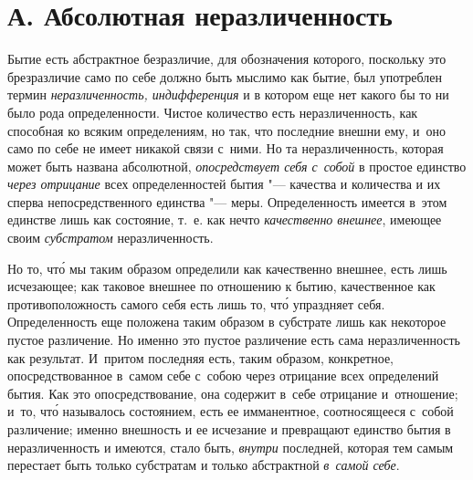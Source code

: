 \section[А. Абсолютная неразличенность]%
{А. Абсолютная неразличенность}

Бытие есть абстрактное безразличие, для обозначения которого, поскольку это
брезразличие само по себе должно быть мыслимо как бытие, был употреблен
термин {\em неразличенность, индифференция}
и в котором еще нет какого бы то ни было рода определенности. Чистое количество
есть неразличенность, как способная ко всяким определениям, но так, что
последние внешни ему, и~оно само по себе не имеет никакой связи с~ними. Но та
неразличенность, которая может быть названа абсолютной, {\em опосредствует себя
с~собой} в простое единство {\em через отрицание} всех определенностей бытия
"--- качества и количества и их сперва непосредственного единства "--- меры.
Определенность имеется в~этом единстве лишь как состояние, т.~е. как нечто
{\em качественно внешнее}, имеющее своим {\em субстратом} неразличенность.

Но то, чт\'{о} мы таким образом определили как качественно внешнее, есть лишь
исчезающее; как таковое внешнее по отношению к бытию, качественное как
противоположность самого себя есть лишь то, чт\'{о} упраздняет себя.
Определенность еще положена таким образом в субстрате лишь как некоторое пустое
различение. Но именно это пустое различение есть сама неразличенность
как результат. И~притом последняя есть, таким образом, конкретное,
опосредствованное в~самом себе с~собою через отрицание всех определений бытия.
Как это опосредствование, она содержит в~себе отрицание и~отношение; и~то,
чт\'{о} называлось состоянием, есть ее имманентное, соотносящееся с~собой
различение; именно внешность и ее исчезание и превращают единство бытия
в неразличенность и имеются, стало быть, {\em внутри} последней, которая тем
самым перестает быть только субстратам и только абстрактной {\em в~самой себе}.

